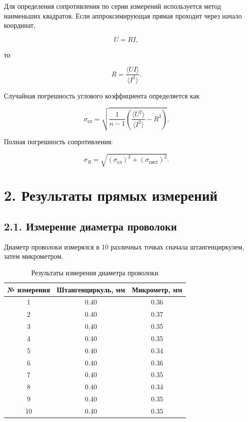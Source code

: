 \documentclass[12pt,a4paper]{article}
\begin{document}
Для определения сопротивления по серии измерений используется метод
наименьших квадратов. Если аппроксимирующая прямая проходит через начало
координат,

\begin{equation}
U=RI,
\end{equation}

то

\begin{equation}
R=
\frac{\langle UI\rangle}
{\langle I^2\rangle}.
\label{eq:mnk}
\end{equation}

Случайная погрешность углового коэффициента определяется как

\begin{equation}
\sigma_{\text{сл}}=
\sqrt{
\frac{1}{n-1}
\left(
\frac{\langle U^2\rangle}
{\langle I^2\rangle}
-R^2
\right)
}.
\label{eq:random}
\end{equation}

Полная погрешность сопротивления:

\begin{equation}
\sigma_R=
\sqrt{
\left(\sigma_{\text{сл}}\right)^2+
\left(\sigma_{\text{сист}}\right)^2
}.
\label{eq:fullR}
\end{equation}


\section*{2. Результаты прямых измерений}

\subsection*{2.1. Измерение диаметра проволоки}

Диаметр проволоки измерялся в 10 различных точках сначала
штангенциркулем, затем микрометром.

\begin{table}[H]
\centering
\caption{Результаты измерения диаметра проволоки}
\label{tab:diam}
\begin{tabular}{c|c|c}
\toprule
№ измерения & Штангенциркуль, мм & Микрометр, мм\\
\midrule
1 & 0.40 & 0.36\\
2 & 0.40 & 0.37\\
3 & 0.40 & 0.35\\
4 & 0.40 & 0.35\\
5 & 0.40 & 0.34\\
6 & 0.40 & 0.36\\
7 & 0.40 & 0.35\\
8 & 0.40 & 0.34\\
9 & 0.40 & 0.35\\
10 & 0.40 & 0.35\\
\bottomrule
\end{tabular}
\end{table}
\end{document}
